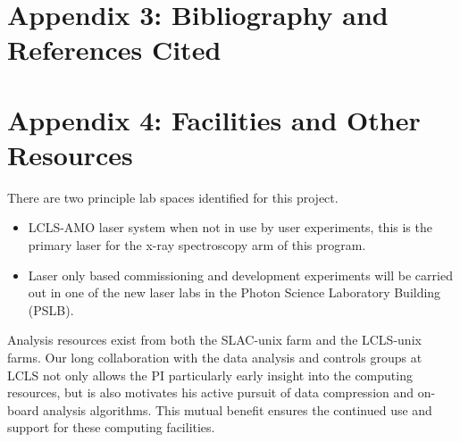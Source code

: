 \documentclass[letterpaper,oneside,11pt]{article}
\begin{document}
\clearpage
\appendix
\section*{Appendix 3: Bibliography and References Cited}%












\clearpage
\appendix
\section*{Appendix 4: Facilities and Other Resources}

There are two principle lab spaces identified for this project.
\begin{itemize}
\item LCLS-AMO laser system when not in use by user experiments, this is the primary laser for the x-ray spectroscopy arm of this program.
\item Laser only based commissioning and development experiments will be carried out in one of the new laser labs in the Photon Science Laboratory Building (PSLB).
\end{itemize}

Analysis resources exist from both the SLAC-unix farm and the LCLS-unix farms.  
Our long collaboration with the data analysis and controls groups at LCLS not only allows the PI particularly early insight into the computing resources, but is also motivates his active pursuit of data compression and on-board analysis algorithms.
This mutual benefit ensures the continued use and support for these computing facilities.
\end{document}
